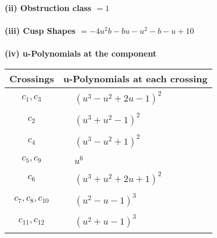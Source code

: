 \documentclass[1p]{elsarticle_modified}
\theoremstyle{definition}
\begin{document}
\flushleft \textbf{(ii) Obstruction class $= 1$}\\~\\
\flushleft \textbf{(iii) Cusp Shapes $= -4 u^2 b- b u- u^2- b- u+10$}\\~\\
\newpage\renewcommand{\arraystretch}{1}
\flushleft \textbf{(iv) u-Polynomials at the component}\newline \\
\begin{tabular}{m{50pt}|m{274pt}}
Crossings & \hspace{64pt}u-Polynomials at each crossing \\
\hline $$\begin{aligned}c_{1},c_{3}\end{aligned}$$&$\begin{aligned}
&(u^3- u^2+2 u-1)^2
\end{aligned}$\\
\hline $$\begin{aligned}c_{2}\end{aligned}$$&$\begin{aligned}
&(u^3+u^2-1)^2
\end{aligned}$\\
\hline $$\begin{aligned}c_{4}\end{aligned}$$&$\begin{aligned}
&(u^3- u^2+1)^2
\end{aligned}$\\
\hline $$\begin{aligned}c_{5},c_{9}\end{aligned}$$&$\begin{aligned}
&u^6
\end{aligned}$\\
\hline $$\begin{aligned}c_{6}\end{aligned}$$&$\begin{aligned}
&(u^3+u^2+2 u+1)^2
\end{aligned}$\\
\hline $$\begin{aligned}c_{7},c_{8},c_{10}\end{aligned}$$&$\begin{aligned}
&(u^2- u-1)^3
\end{aligned}$\\
\hline $$\begin{aligned}c_{11},c_{12}\end{aligned}$$&$\begin{aligned}
&(u^2+u-1)^3
\end{aligned}$\\
\hline
\end{tabular}\\~\\
\end{document}
